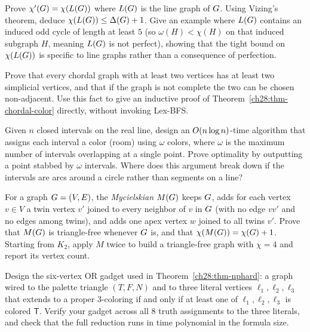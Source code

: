 \begin{exercise}
\label{ch28:ex-linegraph}
Prove $\chi'(G)=\chi(L(G))$ where $L(G)$ is the line graph of $G$. Using Vizing's theorem, deduce
$\chi(L(G))\le\Delta(G)+1$. Give an example where $L(G)$ contains an induced odd cycle of length at least $5$ (so $\omega(H)<\chi(H)$ on that induced subgraph $H$, meaning $L(G)$ is not perfect), showing that the tight bound on $\chi(L(G))$ is specific to line graphs rather than a consequence of perfection.
\end{exercise}

\begin{exercise}
\label{ch28:ex-simplicial}
Prove that every chordal graph with at least two vertices has at least two
simplicial vertices, and that if the graph is not complete the two can be chosen
non-adjacent. Use this fact to give an inductive proof of
Theorem~\ref{ch28:thm-chordal-color} directly, without invoking Lex-BFS.
\end{exercise}

\begin{exercise}
\label{ch28:ex-interval}
Given $n$ closed intervals on the real line, design an $O(n\log n)$-time algorithm that assigns each interval a color
(room) using $\omega$ colors, where $\omega$ is the maximum number of intervals overlapping at a single point. Prove
optimality by outputting a point stabbed by $\omega$ intervals. Where does this
argument break down if the intervals are arcs around a circle rather than segments on a
line?
\end{exercise}

\begin{exercise}
\label{ch28:ex-mycielski}
For a graph $G=(V,E)$, the \emph{Mycielskian} $M(G)$ keeps $G$, adds for each vertex $v\in V$ a twin vertex $v'$ joined to every neighbor of $v$ in $G$ (with no edge $vv'$ and no edges among twins), and adds one apex vertex $w$ joined to all twins $v'$. Prove that $M(G)$ is triangle-free
whenever $G$ is, and that $\chi(M(G))=\chi(G)+1$. Starting from $K_2$, apply $M$ twice to build a
triangle-free graph with $\chi=4$ and report its vertex count.
\end{exercise}

\begin{exercise}
\label{ch28:ex-gadget}
Design the six-vertex OR gadget used in Theorem~\ref{ch28:thm-nphard}: a graph wired to the
palette triangle $(T,F,N)$ and to three literal vertices $\ell_1,\ell_2,\ell_3$ that extends to a proper $3$-coloring if and only if at least one of $\ell_1,\ell_2,\ell_3$ is colored $\mathsf{T}$. Verify your gadget across all $8$ truth
assignments to the three literals, and check that the full reduction runs in time polynomial in the formula size.
\end{exercise}

